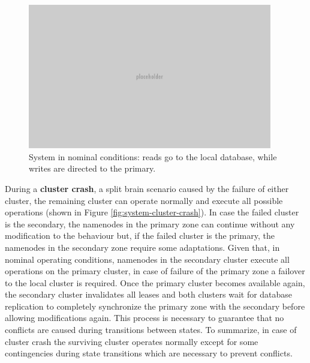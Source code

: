 \begin{figure}[h]
\caption{System in nominal conditions: reads go to the local database, while writes are directed to the primary.}
\label{fig:system-nominal-conditions}
\centering
\includegraphics[width=0.95\textwidth]{images/placeholder.png}
\end{figure}

During a \textbf{cluster crash}, a split brain scenario caused by the failure of either cluster, the remaining cluster can operate normally and execute all possible operations (shown in Figure \ref{fig:system-cluster-crash}).
In case the failed cluster is the secondary, the namenodes in the primary zone can continue without any modification to the behaviour but, if the failed cluster is the primary, the namenodes in the secondary zone require some adaptations.
Given that, in nominal operating conditions, namenodes in the secondary cluster execute all operations on the primary cluster, in case of failure of the primary zone a failover to the local cluster is required.
Once the primary cluster becomes available again, the secondary cluster invalidates all leases and both clusters wait for database replication to completely synchronize the primary zone with the secondary before allowing modifications again.
This process is necessary to guarantee that no conflicts are caused during transitions between states.
To summarize, in case of cluster crash the surviving cluster operates normally except for some contingencies during state transitions which are necessary to prevent conflicts.

